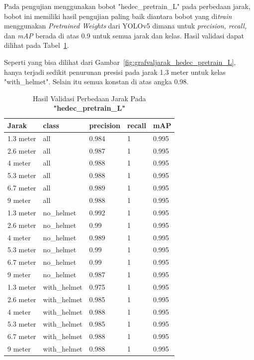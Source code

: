 \begin{enumerate}
  \par Pada pengujian menggunakan bobot "hedec\_pretrain\_L" pada perbedaan jarak, bobot ini memiliki hasil pengujian
  paling baik diantara bobot yang di\emph{train} menggunakan \emph{Pretrained Weights} dari YOLOv5 dimana untuk \emph{precision, recall,} dan \emph{mAP} berada di atas 0.9 untuk semua jarak
  dan kelas. Hasil validasi dapat dilihat pada Tabel~\ref{tb:hasiljarak_hedec_pretrain_L}.

  \par Seperti yang bisa dilihat dari Gambar~\ref{fig:grafvaljarak_hedec_pretrain_L}, hanya terjadi sedikit penurunan presisi
  pada jarak 1.3 meter untuk kelas "with\_helmet". Selain itu semua konstan di atas angka 0.98.


  \begin{longtable}{|l|l|l|l|l|} 
    \caption{Hasil Validasi Perbedaan Jarak Pada \textbf{"hedec\_pretrain\_L"}}
    \label{tb:hasiljarak_hedec_pretrain_L}\\
    \hline
    Jarak     & class        & precision & recall & mAP    \\ 
    \hline
    1.3 meter & all          & 0.984     & 1      & 0.995  \\
    2.6 meter & all          & 0.987     & 1      & 0.995  \\
    4 meter   & all          & 0.988     & 1      & 0.995  \\
    5.3 meter & all          & 0.988     & 1      & 0.995  \\
    6.7 meter & all          & 0.989     & 1      & 0.995  \\
    9 meter   & all          & 0.988     & 1      & 0.995  \\
    1.3 meter & no\_helmet   & 0.992     & 1      & 0.995  \\
    2.6 meter & no\_helmet   & 0.99      & 1      & 0.995  \\
    4 meter   & no\_helmet   & 0.989     & 1      & 0.995  \\
    5.3 meter & no\_helmet   & 0.99      & 1      & 0.995  \\
    6.7 meter & no\_helmet   & 0.99      & 1      & 0.995  \\
    9 meter   & no\_helmet   & 0.987     & 1      & 0.995  \\
    1.3 meter & with\_helmet & 0.975     & 1      & 0.995  \\
    2.6 meter & with\_helmet & 0.985     & 1      & 0.995  \\
    4 meter   & with\_helmet & 0.988     & 1      & 0.995  \\
    5.3 meter & with\_helmet & 0.985     & 1      & 0.995  \\
    6.7 meter & with\_helmet & 0.988     & 1      & 0.995  \\
    9 meter   & with\_helmet & 0.988     & 1      & 0.995  \\
    \hline
  \end{longtable}


\end{enumerate}
